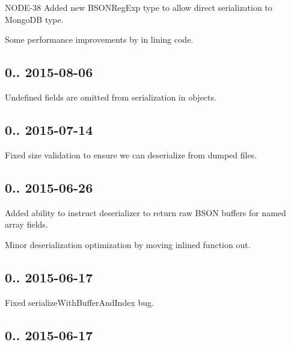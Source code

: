 \begin{DoxyItemize}
\item N\+O\+D\+E-\/38 Added new B\+S\+O\+N\+Reg\+Exp type to allow direct serialization to Mongo\+DB type.
\item Some performance improvements by in lining code.
\end{DoxyItemize}

\subsection*{0.. 2015-\/08-\/06 }


\begin{DoxyItemize}
\item Undefined fields are omitted from serialization in objects.
\end{DoxyItemize}

\subsection*{0.. 2015-\/07-\/14 }


\begin{DoxyItemize}
\item Fixed size validation to ensure we can deserialize from dumped files.
\end{DoxyItemize}

\subsection*{0.. 2015-\/06-\/26 }


\begin{DoxyItemize}
\item Added ability to instruct deserializer to return raw B\+S\+ON buffers for named array fields.
\item Minor deserialization optimization by moving inlined function out.
\end{DoxyItemize}

\subsection*{0.. 2015-\/06-\/17 }


\begin{DoxyItemize}
\item Fixed serialize\+With\+Buffer\+And\+Index bug.
\end{DoxyItemize}

\subsection*{0.. 2015-\/06-\/17 }


